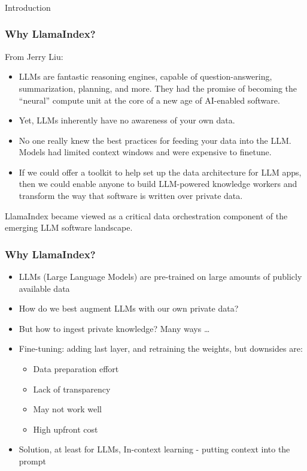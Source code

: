 \begin{frame}[fragile]\frametitle{}
\begin{center}
{\Large Introduction}
\end{center}
\end{frame}

\begin{frame}[fragile]\frametitle{Why LlamaIndex?}

From Jerry Liu:

\begin{itemize}
\item LLMs are fantastic reasoning engines, capable of question-answering, summarization, planning, and more. They had the promise of becoming the “neural” compute unit at the core of a new age of AI-enabled software.
\item Yet, LLMs inherently have no awareness of your own data.
\item No one really knew the best practices for feeding your data into the LLM. Models had limited context windows and were expensive to finetune.
\item If we could offer a toolkit to help set up the data architecture for LLM apps, then we could enable anyone to build LLM-powered knowledge workers and transform the way that software is written over private data.
\end{itemize}	

LlamaIndex became viewed as a critical data orchestration component of the emerging LLM software landscape.

\end{frame}


\begin{frame}[fragile]\frametitle{Why LlamaIndex?}

\begin{itemize}
\item LLMs (Large Language Models) are pre-trained on large amounts of publicly available data
\item How do we best augment LLMs with our own private data?
\item But how to ingest private knowledge? Many ways \ldots
\item Fine-tuning: adding last layer, and retraining the weights, but downsides are:
	\begin{itemize}
	\item Data preparation effort
	\item Lack of transparency
	\item May not work well
	\item High upfront cost
	\end{itemize}	
	
\item Solution, at least for LLMs, In-context learning - putting context into the prompt
\end{itemize}	


\end{frame}



